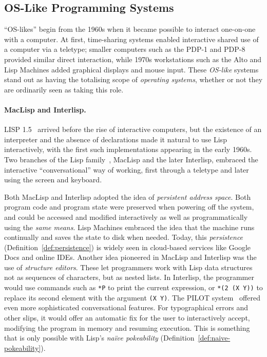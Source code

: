 \hypertarget{os-like-programming-systems}{%
\subsection{OS-Like Programming
Systems}\label{os-like-programming-systems}}

``OS-likes'' begin from the 1960s when it became possible to interact
one-on-one with a computer. At first, time-sharing systems enabled
interactive shared use of a computer via a teletype; smaller computers
such as the PDP-1 and PDP-8 provided similar direct interaction, while
1970s workstations such as the Alto and Lisp Machines added graphical
displays and mouse input. These \emph{OS-like} systems stand out as
having the totalising scope of \emph{operating systems}, whether or not
they are ordinarily seen as taking this role.

\paragraph{MacLisp and Interlisp.}

LISP 1.5~\cite{LISP15} arrived before the rise of interactive computers,
but the existence of an interpreter and the absence of declarations made
it natural to use Lisp interactively, with the first such
implementations appearing in the early 1960s. Two branches of the Lisp
family~\cite{LispEvolve}, MacLisp and the later Interlisp, embraced the
interactive ``conversational'' way of working, first through a teletype
and later using the screen and keyboard.

Both MacLisp and Interlisp adopted the idea of \emph{persistent address
space}. Both program code and program state were preserved when powering
off the system, and could be accessed and modified interactively as well
as programmatically using the \emph{same means}. Lisp Machines embraced
the idea that the machine runs continually and saves the state to disk
when needed. Today, this \emph{persistence}
(Definition~\ref{def:persistence}) is widely seen in cloud-based
services like Google Docs and online IDEs. Another idea pioneered in
MacLisp and Interlisp was the use of \emph{structure editors}. These let
programmers work with Lisp data structures not as sequences of
characters, but as nested lists. In Interlisp, the programmer would use
commands such as \texttt{*P} to print the current expression, or
\texttt{*(2\ (X\ Y))} to replace its second element with the argument
\texttt{(X\ Y)}. The PILOT system~\cite{Pilot} offered even more
sophisticated conversational features. For typographical errors and
other slips, it would offer an automatic fix for the user to
interactively accept, modifying the program in memory and resuming
execution. This is something that is only possible with Lisp's
\emph{naïve pokeability} (Definition~\ref{def:naive-pokeability}).

